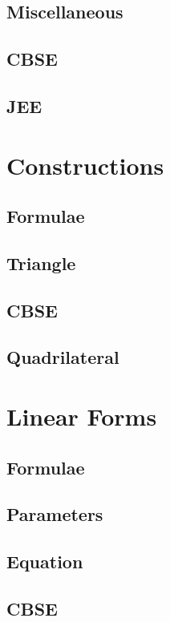 \documentclass[journal]{IEEEtran}
\begin{document}
\subsection{Miscellaneous}

\subsection{CBSE}

\subsection{JEE}

\newpage
\section{Constructions}
\subsection{Formulae}

\subsection{Triangle}

\subsection{CBSE}

\subsection{Quadrilateral}

\newpage
\section{Linear Forms}
\subsection{Formulae}

\subsection{Parameters}

\subsection{Equation }

\subsection{CBSE}

\end{document}
